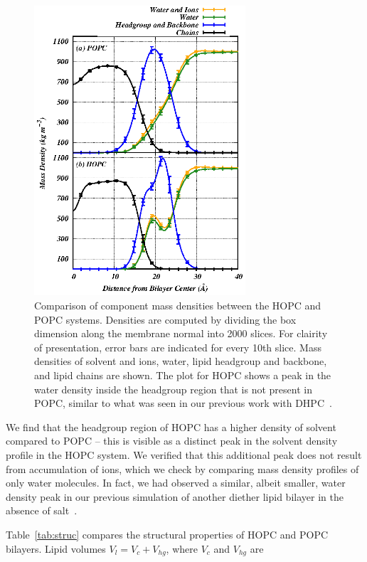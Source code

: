 \documentclass[12pt,preprint,times,openany,draft]{book}
\begin{document}
\begin{figure}[t]
\caption{ 
Comparison of component mass densities between the HOPC and POPC systems. 
Densities are computed by dividing the box dimension along the membrane normal into 2000 slices. For 
clairity of presentation, error bars are indicated for every 10th slice. 
Mass densities of solvent and ions, water, lipid headgroup and backbone, and lipid chains are shown. 
The plot for HOPC shows a peak in the water density inside the headgroup region that is not present in POPC, 
similar to what was seen in our previous work with DHPC~\cite{kruczek:2017:ether}. 
}
\label{fig:massdens}
\includegraphics[width=	0.7\textwidth]{dens_3component.eps}
\end{figure}
We find that the headgroup region of 
HOPC has a higher density of solvent compared to POPC -- this is visible as 
a distinct peak in the solvent density profile in the HOPC system. 
We verified that this additional peak does not
result from accumulation of ions, 
which we check by comparing mass density profiles of only water molecules. In 
fact, we had observed a similar, albeit smaller, water density 
peak in our previous simulation of another diether lipid bilayer in the absence of salt~\cite{kruczek:2017:ether}.

Table~\ref{tab:struc} compares the structural properties of HOPC and POPC bilayers. Lipid volumes $V_l = V_c + V_{hg}$, where $V_c$ and $V_{hg}$ are 
\end{document}

